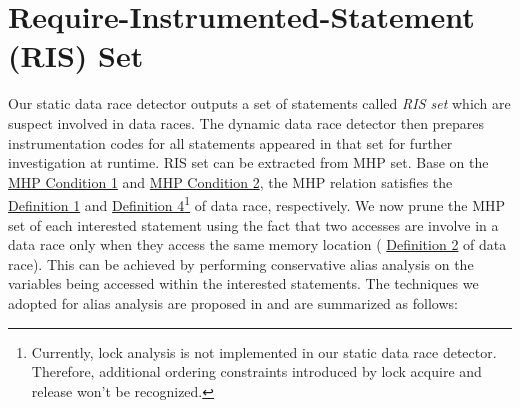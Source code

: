 \section{Require-Instrumented-Statement (RIS) Set}
\label{s:RIS-Set}

Our static data race detector outputs a set of statements called \textit{RIS set} which are suspect involved in data races. The dynamic data race detector then prepares instrumentation codes for all statements appeared in that set for further investigation at runtime. RIS set can be extracted from MHP set. Base on the \hyperref[MHP-Condition-1]{MHP Condition 1} and \hyperref[MHP-Condition-2]{MHP Condition 2}, the MHP relation satisfies the \hyperref[Data-Race-Def-1]{Definition 1} and \hyperref[Data-Race-Def-4]{Definition 4}\footnote{Currently, lock analysis is not implemented in our static data race detector. Therefore, additional ordering constraints introduced by lock acquire and release won't be recognized.} of data race, respectively. We now prune the MHP set of each interested statement using the fact that two accesses are involve in a data race only when they access the same memory location (\ie{} \hyperref[Data-Race-Def-4]{Definition 2} of data race). This can be achieved by performing conservative alias analysis on the variables being accessed within the interested statements. The techniques we adopted for alias analysis are proposed in \cite{WuJay:2009p1241} and are summarized as follows:
